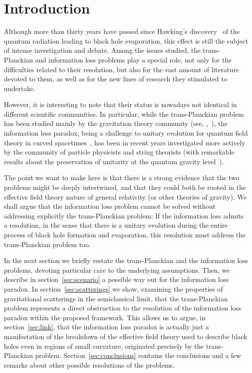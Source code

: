 \documentclass[groupedaddress, showpacs, showkeys, onecolumn, nofootinbib, 12pt]{revtex4}
\begin{document}
\section{Introduction}
\label{sec:intro}

Although more than thirty years have passed since Hawking's discovery~\cite{Hawking:1974rv, Hawking:1974sw} of the quantum radiation leading to black hole evaporation, this effect is still the subject of intense investigation and debate. Among the issues studied, the trans-Planckian and information loss problems play a special role, not only for the difficulties related to their resolution, but also for the vast amount of literature devoted to them, as well as for the new lines of research they stimulated to undertake.

However, it is interesting to note that their status is nowadays not identical in different scientific communities.  In particular, while the trans-Planckian problem has been studied mainly by the gravitation theory community (see, \eg,~\cite{Unruh:1980cg,Unruh:1994je,Brout:1995wp,Corley:1996ar,Barrabes:1998iw,Parentani:1999qv,Barrabes:2000fr,Parentani:2000ts,Parentani:2007mb,Unruh:2004zk}), the information loss paradox, being a challenge to unitary evolution for quantum field theory in curved spacetimes~\cite{Hawking:1976ra, Hawking:1982dj}, has been in recent years investigated more actively by the community of particle physicists and string theorists (with remarkable results about the preservation of unitarity at the quantum gravity level~\cite{Stephens:1993an, 'tHooft:1996tq, Maldacena:2001kr}).

The point we want to make here is that there is a strong evidence that the two problems might be deeply intertwined, and that they could both be rooted in the effective field theory nature of general relativity (or other theories of gravity).  We shall argue that the information loss problem cannot be solved without addressing explicitly the trans-Planckian problem:  If the information loss admits a resolution, in the sense that there is a unitary evolution during the entire process of black hole formation and evaporation, this resolution must address the trans-Planckian problem too.

In the next section we briefly restate the trans-Planckian and the information loss problems, devoting particular care to the underlying assumptions.  Then, we describe in section~\ref{sec:scenario} a possible way out for the information loss paradox.  In section~\ref{sec:scatterings} we show, examining the properties of gravitational scatterings in the semiclassical limit, that the trans-Planckian problem represents a direct obstruction to the resolution of the information loss paradox within the proposed framework.  This allows us to argue, in section~\ref{sec:link}, that the information loss paradox is actually just a manifestation of the breakdown of the effective field theory used to describe black holes even in regions of small curvature, originated precisely by the trans-Planckian problem.  Section~\ref{sec:conclusions} contains the conclusions and a few remarks about other possible resolutions of the problems.
\end{document}
